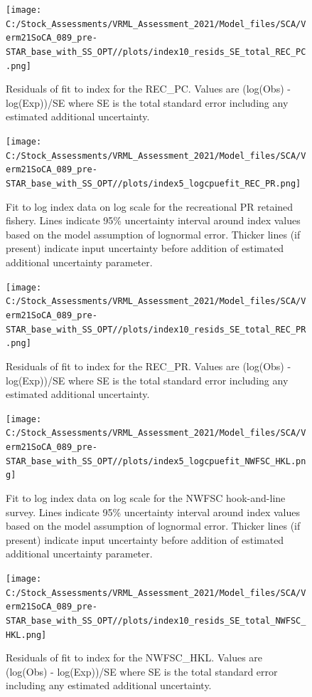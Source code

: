 \documentclass[11pt,
  english,
  a4paper,
]{article}
\begin{document}
\begin{figure}
\centering
\texttt{[image: C:/Stock\_Assessments/VRML\_Assessment\_2021/Model\_files/SCA/Verm21SoCA\_089\_pre-STAR\_base\_with\_SS\_OPT//plots/index10\_resids\_SE\_total\_REC\_PC.png]}
\caption{Residuals of fit to index for the REC\_PC. Values are (log(Obs) - log(Exp))/SE where SE is the total standard error including any estimated additional uncertainty.\label{fig:cpue-resid-REC-PC}}
\end{figure}

\begin{figure}
\centering
\texttt{[image: C:/Stock\_Assessments/VRML\_Assessment\_2021/Model\_files/SCA/Verm21SoCA\_089\_pre-STAR\_base\_with\_SS\_OPT//plots/index5\_logcpuefit\_REC\_PR.png]}
\caption{Fit to log index data on log scale for the recreational PR retained fishery. Lines indicate 95\% uncertainty interval around index values based on the model assumption of lognormal error. Thicker lines (if present) indicate input uncertainty before addition of estimated additional uncertainty parameter.\label{fig:log-cpue-REC-PR}}
\end{figure}

\begin{figure}
\centering
\texttt{[image: C:/Stock\_Assessments/VRML\_Assessment\_2021/Model\_files/SCA/Verm21SoCA\_089\_pre-STAR\_base\_with\_SS\_OPT//plots/index10\_resids\_SE\_total\_REC\_PR.png]}
\caption{Residuals of fit to index for the REC\_PR. Values are (log(Obs) - log(Exp))/SE where SE is the total standard error including any estimated additional uncertainty.\label{fig:cpue-resid-REC-PR}}
\end{figure}

\begin{figure}
\centering
\texttt{[image: C:/Stock\_Assessments/VRML\_Assessment\_2021/Model\_files/SCA/Verm21SoCA\_089\_pre-STAR\_base\_with\_SS\_OPT//plots/index5\_logcpuefit\_NWFSC\_HKL.png]}
\caption{Fit to log index data on log scale for the NWFSC hook-and-line survey. Lines indicate 95\% uncertainty interval around index values based on the model assumption of lognormal error. Thicker lines (if present) indicate input uncertainty before addition of estimated additional uncertainty parameter.\label{fig:log-cpue-NWFSC-HKL}}
\end{figure}

\begin{figure}
\centering
\texttt{[image: C:/Stock\_Assessments/VRML\_Assessment\_2021/Model\_files/SCA/Verm21SoCA\_089\_pre-STAR\_base\_with\_SS\_OPT//plots/index10\_resids\_SE\_total\_NWFSC\_HKL.png]}
\caption{Residuals of fit to index for the NWFSC\_HKL. Values are (log(Obs) - log(Exp))/SE where SE is the total standard error including any estimated additional uncertainty.\label{fig:cpue-resid-NWFSC-HKL}}
\end{figure}
\end{document}
